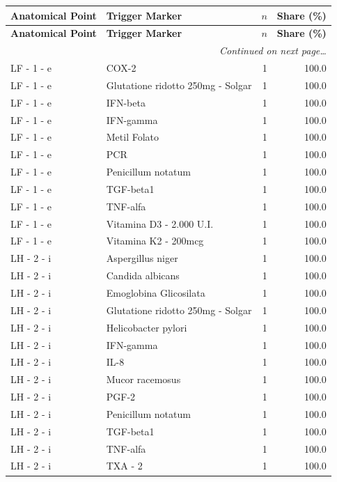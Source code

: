 \documentclass[a4paper,11pt]{article}
\begin{document}
\begin{footnotesize}
\begin{longtable}{p{3.5cm}p{7.5cm}rr}
\toprule
\textbf{Anatomical Point} &
\textbf{Trigger Marker} &
\textbf{$n$} &
\textbf{Share (\%)} \\
\midrule
\endfirsthead
\toprule
\textbf{Anatomical Point} &
\textbf{Trigger Marker} &
\textbf{$n$} &
\textbf{Share (\%)} \\
\midrule
\endhead
\midrule
\multicolumn{4}{r}{\footnotesize\emph{Continued on next page\ldots}} \\
\endfoot
\bottomrule
\endlastfoot
LF - 1 - e & COX-2 & 1 & 100.0 \\
LF - 1 - e & Glutatione ridotto 250mg - Solgar & 1 & 100.0 \\
LF - 1 - e & IFN-beta & 1 & 100.0 \\
LF - 1 - e & IFN-gamma & 1 & 100.0 \\
LF - 1 - e & Metil Folato & 1 & 100.0 \\
LF - 1 - e & PCR & 1 & 100.0 \\
LF - 1 - e & Penicillum notatum & 1 & 100.0 \\
LF - 1 - e & TGF-beta1 & 1 & 100.0 \\
LF - 1 - e & TNF-alfa & 1 & 100.0 \\
LF - 1 - e & Vitamina D3 - 2.000 U.I. & 1 & 100.0 \\
LF - 1 - e & Vitamina K2 - 200mcg & 1 & 100.0 \\
LH - 2 - i & Aspergillus niger & 1 & 100.0 \\
LH - 2 - i & Candida albicans & 1 & 100.0 \\
LH - 2 - i & Emoglobina Glicosilata & 1 & 100.0 \\
LH - 2 - i & Glutatione ridotto 250mg - Solgar & 1 & 100.0 \\
LH - 2 - i & Helicobacter pylori & 1 & 100.0 \\
LH - 2 - i & IFN-gamma & 1 & 100.0 \\
LH - 2 - i & IL-8 & 1 & 100.0 \\
LH - 2 - i & Mucor racemosus & 1 & 100.0 \\
LH - 2 - i & PGF-2 & 1 & 100.0 \\
LH - 2 - i & Penicillum notatum & 1 & 100.0 \\
LH - 2 - i & TGF-beta1 & 1 & 100.0 \\
LH - 2 - i & TNF-alfa & 1 & 100.0 \\
LH - 2 - i & TXA - 2 & 1 & 100.0 \\

\end{longtable}
\end{footnotesize}
\end{document}
